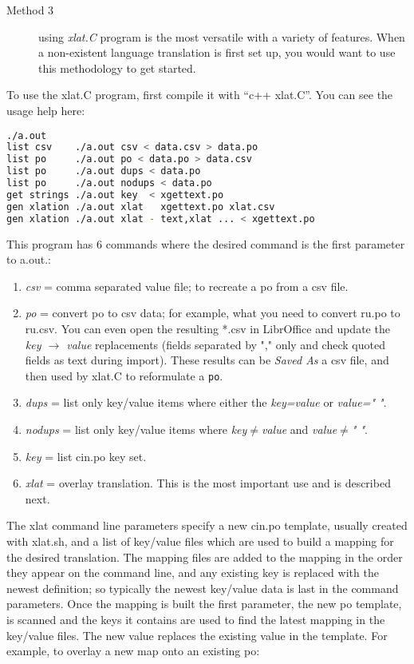 \begin{description}
	\item[Method 3 ] using \textit{xlat.C} program is the most versatile with a variety of features.  When a non-existent language translation is first set up, you would want to use this methodology to get started.
\end{description}

To use the xlat.C program, first compile it with “c++ xlat.C”.  You can see the usage help here:

\begin{lstlisting}[language=bash,numbers=none]
	./a.out 
list csv    ./a.out csv < data.csv > data.po
list po     ./a.out po < data.po > data.csv
list po     ./a.out dups < data.po
list po     ./a.out nodups < data.po
get strings ./a.out key  < xgettext.po
gen xlation ./a.out xlat   xgettext.po xlat.csv
gen xlation ./a.out xlat - text,xlat ... < xgettext.po
\end{lstlisting}

This program has 6 commands where the desired command is the first parameter to a.out.:

\begin{enumerate}
	\item \textit{csv} = comma separated value file; to recreate a po from a csv file.
	\item \textit{po}  = convert po to csv data;  for example, what you need to convert ru.po to ru.csv.
	You can even open the resulting *.csv in LibrOffice and update the \textit{key $\rightarrow$ value} replacements
	(fields separated by "," only and check quoted fields as text during import).  These results can
	be \textit{Saved As} a csv file, and then used by xlat.C to reformulate a \texttt{po}.
	\item \textit{dups} = list only key/value items where either the \textit{key=value} or \textit{value=" "}.
	\item \textit{nodups} = list only key/value items where \textit{key$\ne$value} and \textit{value$\ne$" "}.
	\item \textit{key} = list cin.po key set.
	\item \textit{xlat} = overlay translation.  This is the most important use and is described next.
\end{enumerate}

The xlat command line parameters specify a new cin.po template, usually created with xlat.sh, and a list of key/value files which are used to build a mapping for the desired translation.  The mapping files are added to the mapping in the order they appear on the command line, and any existing key is replaced with the newest definition; so typically the newest key/value data is last in the command parameters.  Once the mapping is built the first parameter, the new po template, is scanned and the keys it contains are used to find the latest mapping in the key/value files.  The new value replaces the existing value in the template.  For example, to overlay a new map onto an existing po:


